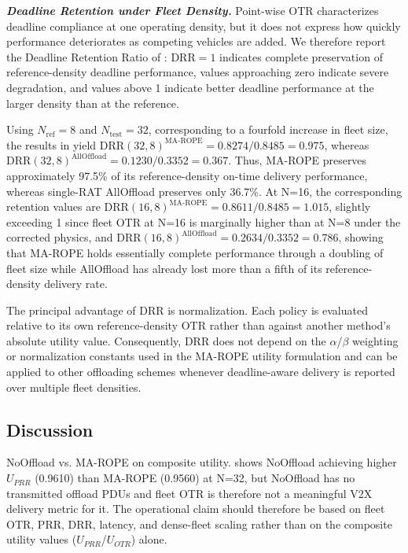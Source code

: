 \textbf{\textit{Deadline Retention under Fleet Density.}} Point-wise OTR characterizes deadline compliance at one operating density, but it does not express how quickly performance deteriorates as competing vehicles are added. We therefore report the Deadline Retention Ratio of : $\text{DRR}=1$ indicates complete preservation of reference-density deadline performance, values approaching zero indicate severe degradation, and values above 1 indicate better deadline performance at the larger density than at the reference.

Using $N_{\text{ref}}=8$ and $N_{\text{test}}=32$, corresponding to a fourfold increase in fleet size, the results in  yield $\text{DRR}(32,8)^{\text{MA-ROPE}} = 0.8274/0.8485 = 0.975$, whereas $\text{DRR}(32,8)^{\text{AllOffload}} = 0.1230/0.3352 = 0.367$. Thus, MA-ROPE preserves approximately 97.5\% of its reference-density on-time delivery performance, whereas single-RAT AllOffload preserves only 36.7\%. At N=16, the corresponding retention values are $\text{DRR}(16,8)^{\text{MA-ROPE}}=0.8611/0.8485=1.015$, slightly exceeding 1 since fleet OTR at N=16 is marginally higher than at N=8 under the corrected physics, and $\text{DRR}(16,8)^{\text{AllOffload}}=0.2634/0.3352=0.786$, showing that MA-ROPE holds essentially complete performance through a doubling of fleet size while AllOffload has already lost more than a fifth of its reference-density delivery rate.

The principal advantage of DRR is normalization. Each policy is evaluated relative to its own reference-density OTR rather than against another method's absolute utility value. Consequently, DRR does not depend on the $\alpha$/$\beta$ weighting or normalization constants used in the MA-ROPE utility formulation and can be applied to other offloading schemes whenever deadline-aware delivery is reported over multiple fleet densities.

\subsection{Discussion}

NoOffload vs. MA-ROPE on composite utility.  shows NoOffload achieving higher $U_{PRR}$ (0.9610) than MA-ROPE (0.9560) at N=32, but NoOffload has no transmitted offload PDUs and fleet OTR is therefore not a meaningful V2X delivery metric for it. The operational claim should therefore be based on fleet OTR, PRR, DRR, latency, and dense-fleet scaling rather than on the composite utility values ($U_{PRR}$/$U_{OTR}$) alone.

